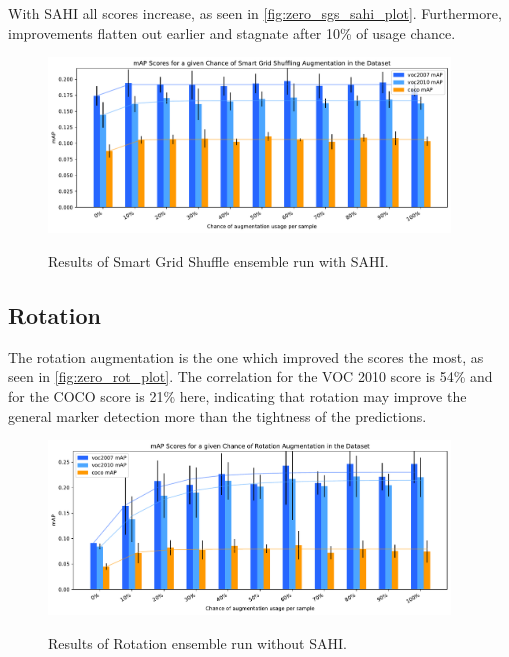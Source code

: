 \documentclass[10pt]{book}
\newcommand{\figureref}[1]{\autoref{#1}}
\begin{document}
With \ac{SAHI} all scores increase, as seen in \figureref{fig:zero_sgs_sahi_plot}. Furthermore, improvements flatten out earlier and stagnate after 10\% of usage chance.

\begin{figure}
  \caption{Results of Smart Grid Shuffle ensemble run with \ac{SAHI}.}
  \includegraphics[width=0.95\textwidth]{image/zero-based-sgs-sahi-ensemble-2-thesis}
  \label{fig:zero_sgs_sahi_plot}
\end{figure}

\subsection{Rotation}

The rotation augmentation is the one which improved the scores the most, as seen in \figureref{fig:zero_rot_plot}. The correlation for the VOC 2010 score is 54\% and for the \ac{COCO} score is 21\% here, indicating that rotation may improve the general marker detection more than the tightness of the predictions. %

\begin{figure}
  \caption{Results of Rotation ensemble run without \ac{SAHI}.}
  \includegraphics[width=0.95\textwidth]{image/zero-based-rot-ensemble-2-thesis}
  \label{fig:zero_rot_plot}
\end{figure}
\end{document}
